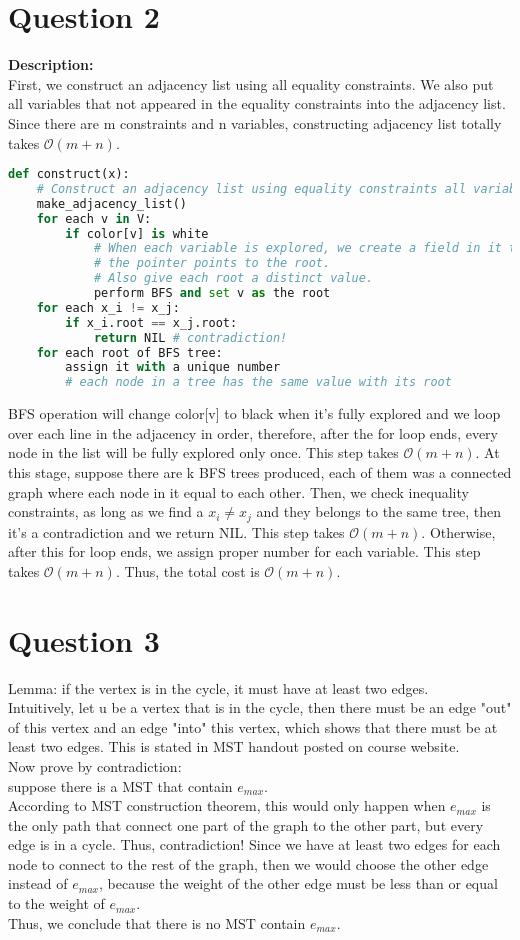 \documentclass[10pt]{article}
\begin{document}
\section*{Question 2}
\textbf{Description:}\\
 First, we construct an adjacency list using all equality constraints. We also put all variables that not appeared in the equality constraints into the adjacency list. Since there are m constraints and n variables, constructing adjacency list totally takes $\mathcal{O}(m+n)$.\\
\begin{lstlisting}[language=Python]
def construct(x):
	# Construct an adjacency list using equality constraints all variables;
	make_adjacency_list()
	for each v in V:
		if color[v] is white
			# When each variable is explored, we create a field in it to store
			# the pointer points to the root.
			# Also give each root a distinct value.
			perform BFS and set v as the root
	for each x_i != x_j:
		if x_i.root == x_j.root:
			return NIL # contradiction!
	for each root of BFS tree:
		assign it with a unique number
		# each node in a tree has the same value with its root
\end{lstlisting}
BFS operation will change color[v] to black when it's fully explored and we loop over each line in the adjacency in order, therefore, after the for loop ends, every node in the list will be fully explored only once. This step takes $\mathcal{O}(m+n)$. At this stage, suppose there are k BFS trees produced, each of them was a connected graph where each node in it equal to each other. Then, we check inequality constraints, as long as we find a $x_i \neq x_j$ and they belongs to the same tree, then it's a contradiction and we return NIL. This step takes $\mathcal{O}(m+n)$. Otherwise, after this for loop ends, we assign proper number for each variable. This step takes $\mathcal{O}(m+n)$. Thus, the total cost is $\mathcal{O}(m+n)$.
\section*{Question 3}
Lemma: if the vertex is in the cycle, it must have at least two edges.\\
Intuitively, let u be a vertex that is in the cycle, then there must be an edge "out" of this vertex and an edge "into" this vertex, which shows that there must be at least two edges. This is stated in MST handout posted on course website.\\
Now prove by contradiction:\\
suppose there is a MST that contain $e_{max}$.\\
According to MST construction theorem, this would only happen when $e_{max}$ is the only path that connect one part of the graph to the other part, but every edge is in a cycle. Thus, contradiction! Since we have at least two edges for each node to connect to the rest of the graph, then we would choose the other edge instead of $e_{max}$, because the weight of the other edge must be less than or equal to the weight of $e_{max}$.\\
Thus, we conclude that there is no MST contain $e_{max}$.
\end{document}

